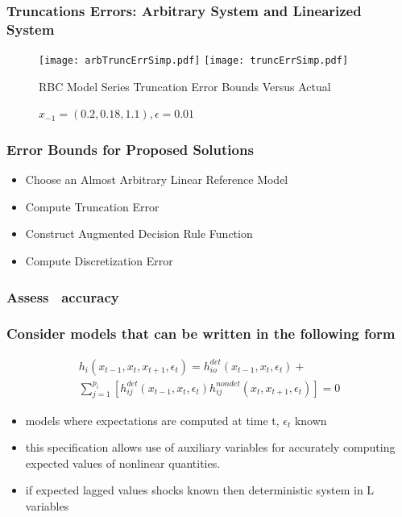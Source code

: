 \documentclass[tikz]{beamer}
\begin{document}
  \begin{frame}
    \frametitle{Truncations Errors: Arbitrary System and Linearized System}


\begin{figure}[H]
  \centering
\texttt{[image: arbTruncErrSimp.pdf]}  
\texttt{[image: truncErrSimp.pdf]}  
\caption{RBC Model Series Truncation Error Bounds Versus Actual}
  \caption{ $x_{-1}=( {{0.2}, {0.18}, {1.1}}), \epsilon=0.01$} \label{arbFig}
\end{figure}


  \end{frame}
  \begin{frame}
\frametitle{Error Bounds for Proposed Solutions}
    
\begin{itemize}
\item Choose an Almost  Arbitrary Linear Reference Model
\item Compute Truncation Error
\item Construct Augmented Decision Rule Function
\item Compute Discretization Error
\end{itemize}

  \end{frame}


\begin{frame}
  \frametitle{Assess \ADR\  accuracy}
\end{frame}



\begin{frame}
\frametitle{Consider  models that can be written in  the following form}


\begin{gather}
  h_i(x_{t-1},x_{t},x_{t+1},\epsilon_t)=h^{det}_{io}(x_{t-1},x_{t},\epsilon_t)+\\ \sum_{j=1}^{p_i} [h^{det}_{ij}(x_{t-1},x_{t},\epsilon_t)h^{nondet}_{ij}(x_{t},x_{t+1},\epsilon_t)]=0
\end{gather}

\begin{itemize}
\item models where expectations are computed at time t, $\epsilon_t$  known
\item this specification allows use of auxiliary variables for 
accurately computing expected values of nonlinear quantities.
\item if expected lagged values shocks known then deterministic system in L variables
\end{itemize}

\end{frame}
\end{document}
